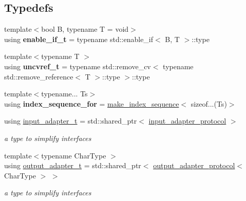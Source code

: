 \subsection*{Typedefs}
\begin{DoxyCompactItemize}
\item 
\mbox{\label{namespacenlohmann_1_1detail_a02bcbc878bee413f25b985ada771aa9c}} 
{\footnotesize template$<$bool B, typename T  = void$>$ }\\using {\bfseries enable\+\_\+if\+\_\+t} = typename std\+::enable\+\_\+if$<$ B, T $>$\+::type
\item 
\mbox{\label{namespacenlohmann_1_1detail_a53a082eedad9f4729fcd8fed552a21f7}} 
{\footnotesize template$<$typename T $>$ }\\using {\bfseries uncvref\+\_\+t} = typename std\+::remove\+\_\+cv$<$ typename std\+::remove\+\_\+reference$<$ T $>$\+::type $>$\+::type
\item 
\mbox{\label{namespacenlohmann_1_1detail_a24800493c6ec02ce033dcbb47b7fd28e}} 
{\footnotesize template$<$typename... Ts$>$ }\\using {\bfseries index\+\_\+sequence\+\_\+for} = \mbox{\hyperlink{structnlohmann_1_1detail_1_1make__index__sequence}{make\+\_\+index\+\_\+sequence}}$<$ sizeof...(Ts)$>$
\item 
\mbox{\label{namespacenlohmann_1_1detail_ae132f8cd5bb24c5e9b40ad0eafedf1c2}} 
using \mbox{\hyperlink{namespacenlohmann_1_1detail_ae132f8cd5bb24c5e9b40ad0eafedf1c2}{input\+\_\+adapter\+\_\+t}} = std\+::shared\+\_\+ptr$<$ \mbox{\hyperlink{structnlohmann_1_1detail_1_1input__adapter__protocol}{input\+\_\+adapter\+\_\+protocol}} $>$
\begin{DoxyCompactList}\small\item\em a type to simplify interfaces \end{DoxyCompactList}\item 
\mbox{\label{namespacenlohmann_1_1detail_a9b680ddfb58f27eb53a67229447fc556}} 
{\footnotesize template$<$typename Char\+Type $>$ }\\using \mbox{\hyperlink{namespacenlohmann_1_1detail_a9b680ddfb58f27eb53a67229447fc556}{output\+\_\+adapter\+\_\+t}} = std\+::shared\+\_\+ptr$<$ \mbox{\hyperlink{structnlohmann_1_1detail_1_1output__adapter__protocol}{output\+\_\+adapter\+\_\+protocol}}$<$ Char\+Type $>$ $>$
\begin{DoxyCompactList}\small\item\em a type to simplify interfaces \end{DoxyCompactList}\end{DoxyCompactItemize}
